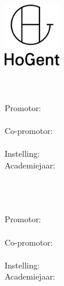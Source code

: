 
\begin{titlepage}
  \begin{center}

    \begingroup
    \rmfamily
    \includegraphics[width=2.5cm]{img/HG-beeldmerk-woordmerk}\\[.5cm]
    \faculteit\\[3cm]
    \titel
    \vfill
    \student\\[3.5cm]
    \rapporttype\\[2cm]
    Promotor:\\
    \promotor\\
    Co-promotor:\\
    \copromotor\\[2.5cm]
    Instelling: \instelling\\[.5cm]
    Academiejaar: \academiejaar\\[.5cm]
    \examenperiode
    \endgroup

  \end{center}
  \restoregeometry
\end{titlepage}


\emptypage


\begin{titlepage}
  \begin{center}

    \begingroup
    \rmfamily
    \faculteit\\[3cm]
    \titel
    \vfill
    \student\\[3.5cm]
    \rapporttype\\[2cm]
    Promotor:\\
    \promotor\\
    Co-promotor:\\
    \copromotor\\[2.5cm]
    Instelling: \instelling\\[.5cm]
    Academiejaar: \academiejaar\\[.5cm]
    \examenperiode
    \endgroup

  \end{center}
  \restoregeometry
\end{titlepage}


